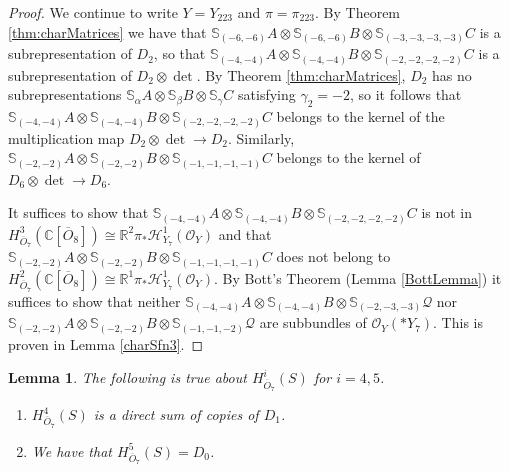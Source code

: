 \documentclass[11pt,reqno]{amsart}
\newcommand{\oo}{\otimes}
\newcommand{\bS}{\mathbb{S}}
\newcommand{\C}{\mathbb{C}}
\renewcommand{\det}{\operatorname{det}}
\newcommand{\mc}[1]{\mathcal{#1}}
\newcommand{\ol}[1]{\overline{#1}}
\newtheorem{lemma}[theorem]{Lemma}
\numberwithin{equation}{section}
\begin{document}
\begin{proof}
We continue to write $Y=Y_{223}$ and $\pi=\pi_{223}$. By Theorem \ref{thm:charMatrices} we have that $\bS_{(-6,-6)}A\oo \bS_{(-6,-6)}B\oo \bS_{(-3,-3,-3,-3)}C$ is a subrepresentation of $D_2$, so that $\bS_{(-4,-4)}A\oo \bS_{(-4,-4)}B\oo \bS_{(-2,-2,-2,-2)}C$	 is a subrepresentation of $D_2\otimes \det$. By Theorem \ref{thm:charMatrices}, $D_2$ has no subrepresentations $\bS_{\alpha}A\oo \bS_{\beta}B\oo \bS_{\gamma}C$ satisfying $\gamma_2=-2$, so it follows that $\bS_{(-4,-4)}A\oo \bS_{(-4,-4)}B\oo \bS_{(-2,-2,-2,-2)}C$ belongs to the kernel of the multiplication map $D_2\otimes \det\to D_2$. Similarly, $\bS_{(-2,-2)}A\oo \bS_{(-2,-2)}B\oo \bS_{(-1,-1,-1,-1)}C$ belongs to the kernel of $D_6\oo \det \to D_6$.

It suffices to show that $\bS_{(-4,-4)}A\oo \bS_{(-4,-4)}B\oo \bS_{(-2,-2,-2,-2)}C$ is not in $H^3_{\ol{O}_7}(\C[\ol{O}_8])\cong \mathbb{R}^2\pi_{\ast}\mathscr{H}^1_{Y_7}(\mc{O}_Y)$ and that $\bS_{(-2,-2)}A\oo \bS_{(-2,-2)}B\oo \bS_{(-1,-1,-1,-1)}C$ does not belong to $H^2_{\ol{O}_7}(\C[\ol{O}_8])\cong \mathbb{R}^1\pi_{\ast}\mathscr{H}^1_{Y_7}(\mc{O}_Y)$. By Bott's Theorem (Lemma \ref{BottLemma}) it suffices to show that neither $\bS_{(-4,-4)}A\oo \bS_{(-4,-4)}B\oo \bS_{(-2,-3,-3)}\mc{Q}$ nor $\bS_{(-2,-2)}A\oo \bS_{(-2,-2)}B\oo \bS_{(-1,-1,-2)}\mc{Q}$ are subbundles of $\mc{O}_Y(\ast Y_7)$. This is proven in Lemma \ref{charSfn3}.
\end{proof}


\begin{lemma}\label{lem:reduceD1D5}
The following is true about $H^i_{\ol{O}_7}(S)$ for $i=4,5$.
\begin{enumerate}
\item $H^4_{\ol{O}_7}(S)$ is a direct sum of copies of $D_1$.
\item We have that $H^5_{\ol{O}_7}(S)=D_0$.	
\end{enumerate}
	
\end{lemma}
\end{document}
